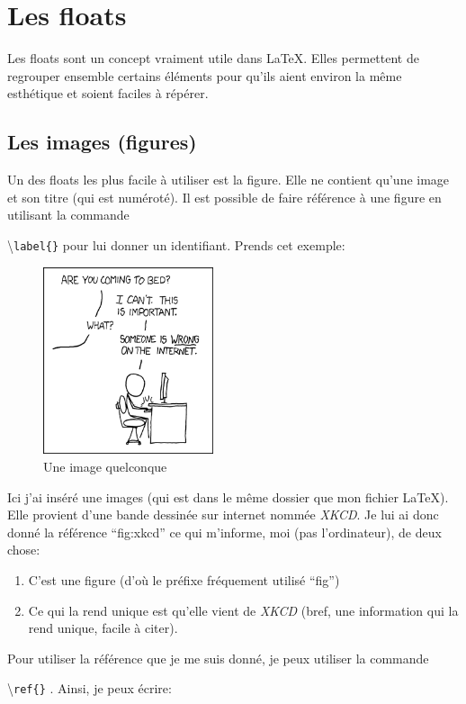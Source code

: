 \documentclass[a4paper, 10pt]{article}
\newcommand{\command}[1]{
	\colorbox{codebackground}{\scriptsize{\textbackslash}\texttt{#1}}
}
\begin{document}
\section{Les floats}

Les floats sont un concept vraiment utile dans \LaTeX. Elles permettent de
regrouper ensemble certains éléments pour qu'ils aient environ la même
esthétique et soient faciles à répérer.

\subsection{Les images (figures)}
Un des floats les plus facile à utiliser est la figure. Elle ne contient
qu'une image et son titre (qui est numéroté). Il est possible de faire
référence à une figure en utilisant la commande
\command{label\{\}} pour lui
donner un identifiant. Prends cet exemple:

\begin{figure}[H]
	\begin{center}
		\caption{Une image quelconque}
		\label{fig:xkcd}
		\includegraphics[width=5cm]{image.png}
	\end{center}
\end{figure}

Ici j'ai inséré une images (qui est dans le même dossier que mon fichier
\LaTeX). Elle provient d'une bande dessinée sur internet nommée \textit{XKCD}.
Je lui ai donc donné la référence ``fig:xkcd'' ce qui m'informe, moi (pas
l'ordinateur), de deux chose:
\begin{enumerate}
\item
	C'est une figure (d'où le préfixe fréquement utilisé ``fig'')
\item
	Ce qui la rend unique est qu'elle vient de \textit{XKCD}
	(bref, une information qui la rend unique, facile à citer).
\end{enumerate}
Pour utiliser la référence que je me suis donné, je peux utiliser la commande
\command{ref\{\}}. Ainsi, je peux écrire:
\end{document}
